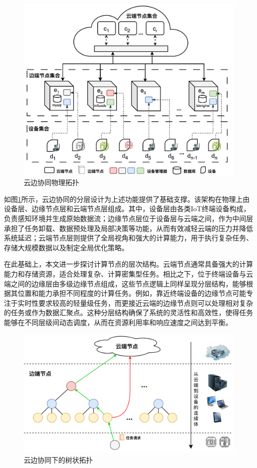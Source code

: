 \begin{figure}[ht]
  \centering
  \includegraphics[width=0.9\linewidth]{pics/3-2模型架构.png}
  \caption{云边协同物理拓扑}
  \label{fig:3-2model}
\end{figure}

如图\ref{fig:3-2model}所示，云边协同的分层设计为上述功能提供了基础支撑。该架构在物理上由设备层、边缘节点层和云端节点层组成。其中，设备层由各类IoT终端设备构成，负责感知环境并生成原始数据流；边缘节点层位于设备层与云端之间，作为中间层承担了任务卸载、数据预处理及局部决策等功能，从而有效减轻云端的压力并降低系统延迟；云端节点层则提供了全局视角和强大的计算能力，用于执行复杂任务、存储大规模数据以及制定全局优化策略。

在此基础上，本文进一步探讨计算节点的层次结构。云端节点通常具备强大的计算能力和存储资源，适合处理复杂、计算密集型任务。相比之下，位于终端设备与云端之间的边缘层由多级边缘节点组成，这些节点逻辑上同样呈现分层结构，能够根据其位置和能力承担不同程度的计算任务。例如，靠近终端设备的边缘节点可能专注于实时性要求较高的轻量级任务，而更接近云端的边缘节点则可以处理相对复杂的任务或作为数据汇聚点。这种分层结构确保了系统的灵活性和高效性，使得任务能够在不同层级间动态调度，从而在资源利用率和响应速度之间达到平衡。

\begin{figure}[ht]
  \centering
  \includegraphics[width=0.8\linewidth]{pics/3-5schedule.png}
  \caption{云边协同下的树状拓扑}
  \label{fig:3-5schedule}
\end{figure}

